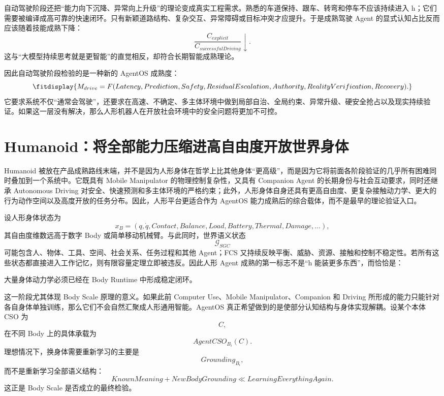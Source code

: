 自动驾驶阶段还把“能力向下沉降、异常向上升级”的理论变成真实工程需求。熟悉的车道保持、跟车、转弯和停车不应该持续进入 h；它们需要被编译成高可靠的快速闭环。只有新颖道路结构、复杂交互、异常障碍或目标冲突才应提升。于是成熟驾驶 Agent 的显式认知占比反而应该随着技能成熟下降：
\[
\frac{
C_{explicit}
}{
C_{successfulDriving}
}
\downarrow.
\]
这与“大模型持续思考就是更智能”的直觉相反，却符合长期智能成熟理论。

因此自动驾驶阶段检验的是一种新的 AgentOS 成熟度：
\[
\fitdisplay{
M_{drive}
=
F(
Latency,
Prediction,
Safety,
ResidualEscalation,
Authority,
RealityVerification,
Recovery
).
}
\]
它要求系统不仅“通常会驾驶”，还要求在高速、不确定、多主体环境中做到局部自治、全局约束、异常升级、硬安全抢占以及现实持续验证。如果这一层没有解决，那么人形机器人在开放社会环境中的安全问题将更加不可控。

\section{Humanoid：将全部能力压缩进高自由度开放世界身体}

Humanoid 被放在产品成熟路线末端，并不是因为人形身体在哲学上比其他身体“更高级”，而是因为它将前面各阶段验证的几乎所有困难同时叠加到一个系统中。它既具有 Mobile Manipulator 的物理控制复杂性，又具有 Companion Agent 的长期身份与社会互动要求，同时还继承 Autonomous Driving 对安全、快速预测和多主体环境的严格约束；此外，人形身体自身还具有更高自由度、更复杂接触动力学、更大的行为动作空间以及高度开放的任务分布。因此，人形平台更适合作为 AgentOS 能力成熟后的综合载体，而不是最早的理论验证入口。

设人形身体状态为
\[
x_B
=
(
q,\dot q,
Contact,
Balance,
Load,
Battery,
Thermal,
Damage,\ldots
),
\]
其自由度维数远高于数字 Body 或简单移动机械臂。与此同时，世界语义状态
\[
\mathcal{G}_{SGC}
\]
可能包含人、物体、工具、空间、社会关系、任务过程和其他 Agent；FCS 又持续反映平衡、威胁、资源、接触和控制不稳定性。若所有这些状态都直接进入工作记忆，则有限容量定理立即被违反。因此人形 Agent 成熟的第一标志不是“h 能装更多东西”，而恰恰是：
\begin{statementbox}
\centering
{}
\end{statementbox}
大量身体动力学必须已经在 Body Runtime 中形成稳定闭环。

这一阶段尤其体现 Body Scale 原理的意义。如果此前 Computer Use、Mobile Manipulator、Companion 和 Driving 所形成的能力只能针对各自身体单独训练，那么它们不会自然汇聚成人形通用智能。AgentOS 真正希望做到的是使部分认知结构与身体实现解耦。设某个本体 CSO 为
\[
C,
\]
在不同 Body 上的具体承载为
\[
AgentCSO_{B_i}(C).
\]
理想情况下，换身体需要重新学习的主要是
\[
Grounding_{B_i},
\]
而不是重新学习全部语义结构：
\[
\boxed{
KnownMeaning
+
NewBodyGrounding
\ll
LearningEverythingAgain.
}
\]
这正是 Body Scale 是否成立的最终检验。

